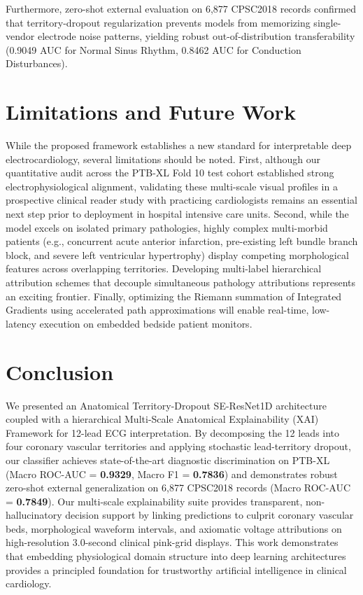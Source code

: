 \documentclass[5p,twocolumn,10pt]{elsarticle}
\begin{document}
Furthermore, zero-shot external evaluation on 6,877 CPSC2018 records confirmed that territory-dropout regularization prevents models from memorizing single-vendor electrode noise patterns, yielding robust out-of-distribution transferability (0.9049 AUC for Normal Sinus Rhythm, 0.8462 AUC for Conduction Disturbances).

\section{Limitations and Future Work}
\label{sec:limitations}
While the proposed framework establishes a new standard for interpretable deep electrocardiology, several limitations should be noted. First, although our quantitative audit across the PTB-XL Fold 10 test cohort established strong electrophysiological alignment, validating these multi-scale visual profiles in a prospective clinical reader study with practicing cardiologists remains an essential next step prior to deployment in hospital intensive care units. Second, while the model excels on isolated primary pathologies, highly complex multi-morbid patients (e.g., concurrent acute anterior infarction, pre-existing left bundle branch block, and severe left ventricular hypertrophy) display competing morphological features across overlapping territories. Developing multi-label hierarchical attribution schemes that decouple simultaneous pathology attributions represents an exciting frontier. Finally, optimizing the Riemann summation of Integrated Gradients using accelerated path approximations will enable real-time, low-latency execution on embedded bedside patient monitors.

\section{Conclusion}
\label{sec:conclusion}
We presented an Anatomical Territory-Dropout SE-ResNet1D architecture coupled with a hierarchical Multi-Scale Anatomical Explainability (XAI) Framework for 12-lead ECG interpretation. By decomposing the 12 leads into four coronary vascular territories and applying stochastic lead-territory dropout, our classifier achieves state-of-the-art diagnostic discrimination on PTB-XL (Macro ROC-AUC = \textbf{0.9329}, Macro F1 = \textbf{0.7836}) and demonstrates robust zero-shot external generalization on 6,877 CPSC2018 records (Macro ROC-AUC = \textbf{0.7849}). Our multi-scale explainability suite provides transparent, non-hallucinatory decision support by linking predictions to culprit coronary vascular beds, morphological waveform intervals, and axiomatic voltage attributions on high-resolution 3.0-second clinical pink-grid displays. This work demonstrates that embedding physiological domain structure into deep learning architectures provides a principled foundation for trustworthy artificial intelligence in clinical cardiology.
\end{document}
